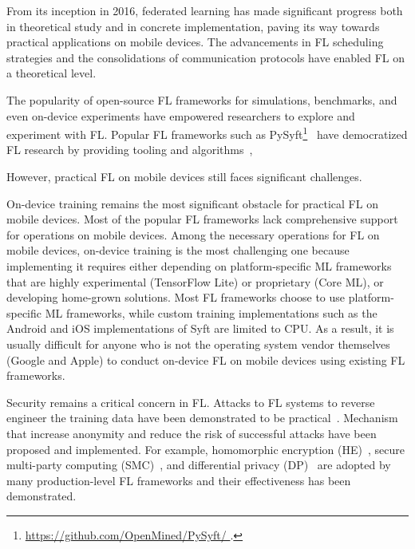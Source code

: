 \documentclass[conference]{IEEEtran}
\begin{document}

From its inception in 2016,
federated learning has made significant progress both in
theoretical study and in concrete implementation,
paving its way towards practical applications on mobile devices.
The advancements in FL scheduling strategies and
the consolidations of communication protocols have
enabled FL on a theoretical level.

The popularity of open-source FL frameworks for simulations, benchmarks,
and even on-device experiments have empowered researchers to
explore and experiment with FL.
Popular FL frameworks such as
PySyft\footnote{\url{
    https://github.com/OpenMined/PySyft/
}.}~\cite{ryffel2018generic,Ziller2021,hall2021syft}
have democratized FL research by providing tooling and
algorithms~\cite{sriraman2022device},

However, practical FL on mobile devices still faces significant challenges.

On-device training remains the most significant obstacle for
practical FL on mobile devices.
Most of the popular FL frameworks lack comprehensive support for
operations on mobile devices.
Among the necessary operations for FL on mobile devices,
on-device training is the most challenging one because
implementing it requires either depending on
platform-specific ML frameworks that are highly experimental (TensorFlow Lite)
or proprietary (Core ML),
or developing home-grown solutions.
Most FL frameworks choose to use platform-specific ML frameworks,
while custom training implementations such as
the Android and iOS implementations of Syft are limited to CPU.
As a result, it is usually difficult for anyone who is not
the operating system vendor themselves (Google and Apple)
to conduct on-device FL
on mobile devices using existing FL frameworks.

Security remains a critical concern in FL.
Attacks to FL systems to reverse engineer the training data have been
demonstrated to be practical~\cite{sun2019really}.
Mechanism that increase anonymity and
reduce the risk of successful attacks have been proposed and implemented.
For example,
homomorphic encryption (HE)~\cite{wang2020homo},
secure multi-party computing (SMC)~\cite{bonawitz2016practical}, and
differential privacy
(DP)~\cite{dwork2006differential,geyer2017differentially} are
adopted by many production-level FL frameworks and
their effectiveness has been demonstrated.
\end{document}
